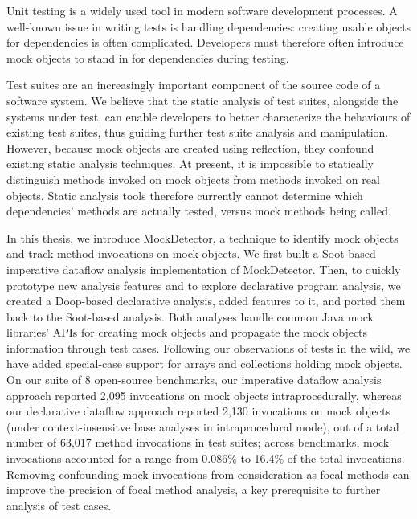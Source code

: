 Unit testing is a widely used tool in modern software development processes. A well-known issue in writing tests is handling dependencies: creating usable objects for dependencies is often complicated. Developers must therefore often introduce mock objects to stand in for dependencies during testing. 

Test suites are an increasingly important component of the source code of a software system. We believe that the static analysis of test suites, alongside the systems under test, can enable developers to better characterize the behaviours of existing test suites, thus guiding further test suite analysis and manipulation. However, because mock objects are created using reflection, they confound existing static analysis techniques. At present, it is impossible to statically distinguish methods invoked on mock objects from methods invoked on real objects. Static analysis tools therefore currently cannot determine which dependencies' methods are actually tested, versus mock methods being called.

In this thesis, we introduce MockDetector, a technique to identify mock objects and track method invocations on mock objects. We first built a Soot-based imperative dataflow analysis implementation of MockDetector. Then, to quickly prototype new analysis features and to explore declarative program analysis, we created a Doop-based declarative analysis, added features to it, and ported them back to the Soot-based analysis. Both analyses handle common Java mock libraries' APIs for creating mock objects and propagate the mock objects information through test cases. Following our observations of tests in the wild, we have added special-case support for arrays and collections holding mock objects. On our suite of 8 open-source benchmarks, our imperative dataflow analysis approach reported 2,095 invocations on mock objects intraprocedurally, whereas our declarative dataflow approach reported 2,130 invocations on mock objects (under context-insensitve base analyses in intraprocedural mode), out of a total number of 63,017 method invocations in test suites; across benchmarks, mock invocations accounted for a range from 0.086\% to 16.4\% of the total invocations. Removing confounding mock invocations from consideration as focal methods can improve the precision of focal method analysis, a key prerequisite to further analysis of test cases.